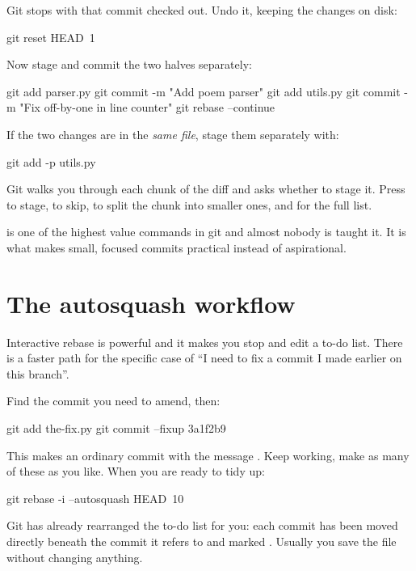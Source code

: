\documentclass[11pt]{article}
\begin{document}
Git stops with that commit checked out. Undo it, keeping the changes on disk:

\begin{shell}
git reset HEAD~1
\end{shell}

Now stage and commit the two halves separately:

\begin{shell}
git add parser.py
git commit -m "Add poem parser"
git add utils.py
git commit -m "Fix off-by-one in line counter"
git rebase --continue
\end{shell}

\begin{tryit}
If the two changes are in the \emph{same file}, stage them separately with:

\begin{shell}
git add -p utils.py
\end{shell}

Git walks you through each chunk of the diff and asks whether to stage it.
Press  to stage,  to skip,  to split the chunk into smaller ones,
and  for the full list.

 is one of the highest value commands in git and almost nobody is
taught it. It is what makes small, focused commits practical instead of aspirational.
\end{tryit}

\section{The autosquash workflow}

Interactive rebase is powerful and it makes you stop and edit a to-do list. There is
a faster path for the specific case of ``I need to fix a commit I made earlier on
this branch''.

Find the commit you need to amend, then:

\begin{shell}
git add the-fix.py
git commit --fixup 3a1f2b9
\end{shell}

This makes an ordinary commit with the message . Keep
working, make as many of these as you like. When you are ready to tidy up:

\begin{shell}
git rebase -i --autosquash HEAD~10
\end{shell}

Git has already rearranged the to-do list for you: each  commit has been
moved directly beneath the commit it refers to and marked . Usually you
save the file without changing anything.
\end{document}

